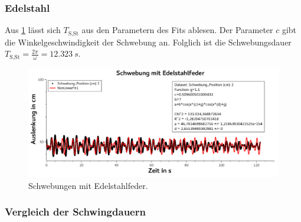 \documentclass[
	a4paper,
	12pt,
	pagesize,
	ngerman
]{scrartcl}
\begin{document}
	\subsubsection*{Edelstahl}
	Aus \cref{EdelstahlSchwebung} lässt sich $T_\text{S,St}$ aus den Parametern des Fits ablesen. Der Parameter $c$ gibt die Winkelgeschwindigkeit der Schwebung an. Folglich ist die Schwebungsdauer $T_\text{S,St} = \frac{2\pi}{\omega} = \SI{12,323}{s}$.
	\begin{figure}[H]
		\includegraphics[width=1\textwidth]{EdelstahlSchwebung}
		\centering
		\caption{Schwebungen mit Edelstahlfeder.}
		\label{EdelstahlSchwebung}
		\centering
	\end{figure}

	\subsubsection{Vergleich der Schwingdauern}
\end{document}
